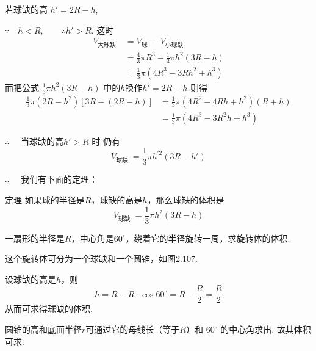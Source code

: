 若球缺的高 $h' =2R-h$,

$\because\quad  h<R,\qquad   \therefore h' >R$. 这时
\[\begin{split}
    V_{\text{大球缺 }}&=V_{\text{球 }}-V_{\text{小球缺 }}\\
&=\frac{4}{3}\pi  R^{3}-\frac{1}{3}\pi  h^{2}(3R-h)\\
&=\frac{1}{3}\pi \left(4R^{3}-3Rh^{2}+h^{3}\right)
\end{split}\]
而把公式 $\frac{1}{3}\pi  h^{2}(3R-h)$ 中的$h$换作$h' =2R-h$ 则得
\[\begin{split}
\frac{1}{3}\pi \left(2R-h^{2}\right)[3R-(2R-h)]&
=\frac{1}{3}\pi \left(4R^{2}-4Rh+h^{2}\right)(R+h)
\\
&=\frac{1}{3}\pi \left(4R^{3}-3R^{2}h+h^{3}\right)    
\end{split}\]

$\therefore\quad$ 当球缺的高$h' >R$ 时
仍有
\[V_{\text{球缺 }}=\frac{1}{3}\pi  h^{\prime 2}\left(3R-h' \right)\]

$\therefore\quad$ 我们有下面的定理：

\begin{thm}
{定理} 如果球的半径是$R$，球缺的高是$h$，那么球缺的体积是
\[V_{\text{球缺 }}=\frac{1}{3}\pi  h^2 \left(3R-h \right)\]
\end{thm}

\begin{example}
 一扇形的半径是$R$，中心角是$60^{\circ}$，绕着它的半径旋转一周，求旋转体的体积.
\end{example}

\noindent
\begin{minipage}{.5\textwidth}\CTEXindent
\begin{analyze}
这个旋转体可分为一个球缺和一个圆锥，如图2.107. 

设球缺的高是$h$，则
\[
h=R-R\cdot \cos 60^{\circ}=R-\frac{R}{2}=\frac{R}{2}\]
从而可求得球缺的体积.

圆锥的高和底面半径$r$可通过它的母线长（等于$R$）和 $60^{\circ}$ 的中心角求出. 故其体积可求.
\end{analyze}
\end{minipage}\hfill
\begin{minipage}{.46\textwidth}
\centering
{}
\end{minipage}



